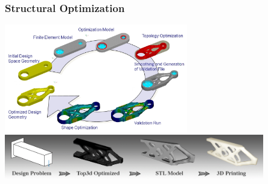 \documentclass[handout]{beamer}
{
\usepackage{fullpage}
\usepackage{hyperref}
\usepackage{amssymb} 
}
\begin{document}
\begin{frame}
\frametitle{Structural Optimization}
  \begin{center}
   \includegraphics[width=0.6\textwidth]{figures/TOSCA.jpg}
   \vfill
  \includegraphics[width=0.85\textwidth]{figures/top3d_banner1.png}
  \end{center}

\end{frame}
\end{document}
